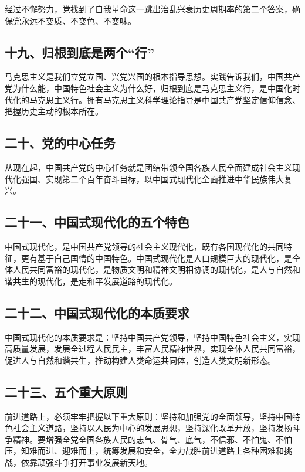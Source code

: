 \documentclass[UTF8,11pt,a4paper]{ctexart}
\begin{document}
经过不懈努力，党找到了自我革命这一跳出治乱兴衰历史周期率的第二个答案，确保党永远不变质、不变色、不变味。

\subsection*{十九、归根到底是两个“行”}

马克思主义是我们立党立国、兴党兴国的根本指导思想。实践告诉我们，中国共产党为什么能，中国特色社会主义为什么好，归根到底是马克思主义行，是中国化时代化的马克思主义行。拥有马克思主义科学理论指导是中国共产党坚定信仰信念、把握历史主动的根本所在。

\subsection*{二十、党的中心任务}

从现在起，中国共产党的中心任务就是团结带领全国各族人民全面建成社会主义现代化强国、实现第二个百年奋斗目标，以中国式现代化全面推进中华民族伟大复兴。

\subsection*{二十一、中国式现代化的五个特色}

中国式现代化，是中国共产党领导的社会主义现代化，既有各国现代化的共同特征，更有基于自己国情的中国特色。中国式现代化是人口规模巨大的现代化，是全体人民共同富裕的现代化，是物质文明和精神文明相协调的现代化，是人与自然和谐共生的现代化，是走和平发展道路的现代化。

\subsection*{二十二、中国式现代化的本质要求}

中国式现代化的本质要求是：坚持中国共产党领导，坚持中国特色社会主义，实现高质量发展，发展全过程人民民主，丰富人民精神世界，实现全体人民共同富裕，促进人与自然和谐共生，推动构建人类命运共同体，创造人类文明新形态。

\subsection*{二十三、五个重大原则}

前进道路上，必须牢牢把握以下重大原则：坚持和加强党的全面领导，坚持中国特色社会主义道路，坚持以人民为中心的发展思想，坚持深化改革开放，坚持发扬斗争精神。要增强全党全国各族人民的志气、骨气、底气，不信邪、不怕鬼、不怕压，知难而进、迎难而上，统筹发展和安全，全力战胜前进道路上各种困难和挑战，依靠顽强斗争打开事业发展新天地。
\end{document}
